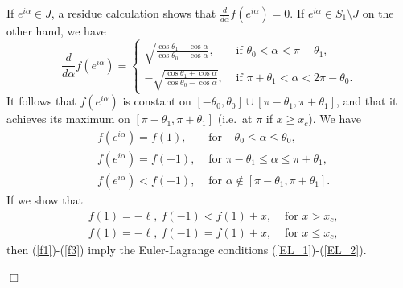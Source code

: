 \documentclass[11pt,fleqn]{article}
\numberwithin{equation}{section}
\newenvironment{proof}%
    {\rm \trivlist \item[\hskip \labelsep{\bf Proof. }]}%
    {\hspace*{\fill}$\Box$\endtrivlist}
\begin{document}
\begin{proof}
If $e^{i\alpha} \in J$, a residue calculation shows that $\frac{d}{d\alpha} f(e^{i\alpha})=0$.
If $e^{i\alpha} \in S_{1}\setminus J$ on the other hand, we have
\begin{equation} \label{derivative_of_EL}
\frac{d}{d\alpha} f(e^{i\alpha})  
 = \begin{cases}
 \sqrt{\frac{\cos \theta_{1} + \cos \alpha}{ \cos \theta_{0} - \cos \alpha}}, & \mbox{ if } \theta_{0} < \alpha < \pi-\theta_{1}, \\[0.4cm]
 -\sqrt{\frac{\cos \theta_{1} + \cos \alpha}{ \cos \theta_{0} - \cos \alpha}}, & \mbox{ if } \pi+\theta_{1} < \alpha < 2\pi-\theta_{0}.
\end{cases} 
\end{equation}
It follows that $f(e^{i \alpha})$ is constant on $[-\theta_0,\theta_0]\cup[\pi-\theta_1,\pi+\theta_1]$, and that it achieves its maximum on $[\pi-\theta_1,\pi+\theta_1]$ (i.e.\ at $\pi$ if $x\geq x_c$). 
We have
\begin{align}
&\label{f1}f(e^{i\alpha})=f(1),&\mbox{ for $-\theta_0\leq \alpha\leq \theta_0$},\\
&f(e^{i\alpha})=f(-1),&\mbox{ for $\pi-\theta_1\leq \alpha\leq \pi+\theta_1$},\\
&\label{f3}f(e^{i\alpha})< f(-1),&\mbox{ for $\alpha\notin [\pi-\theta_1,\pi+\theta_1]$}.
\end{align}
If we show that 
\begin{align}
&\label{toshowf1}f(1)=-\ell, \ f(-1)<f(1)+x, & \mbox{ for $x>x_c$},\\
&\label{toshowf2}f(1)=-\ell, \ f(-1)=f(1)+x, & \mbox{ for $x\leq x_c$},
\end{align}
then (\ref{f1})-(\ref{f3}) imply the Euler-Lagrange conditions (\ref{EL_1})-(\ref{EL_2}).




\end{proof}
\end{document}
